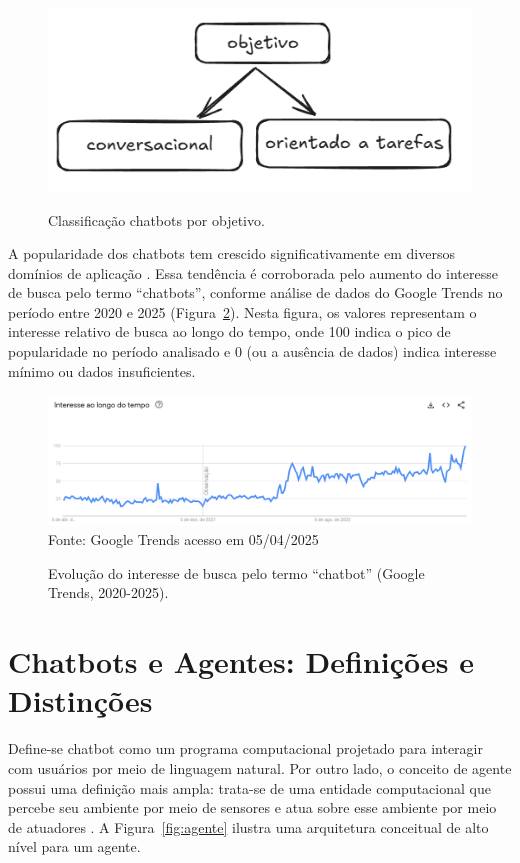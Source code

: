 \documentclass[14pt,a4paper,oneside]{book}
\begin{document}
\begin{figure}[!htbp]
	\centering
	\caption{Classificação chatbots por objetivo.}
	\includegraphics[width=0.9\linewidth]{./fig/tipo_objetivo.png}
	\label{fig:tipo}
\end{figure}

A popularidade dos chatbots tem crescido significativamente em diversos domínios de aplicação \cite{B2020, Klopfenstein2017, Sharma2020}. 
Essa tendência é corroborada pelo aumento do interesse de busca pelo termo ``chatbots'', conforme análise de dados do Google Trends no período entre 2020 e 2025 (Figura~\ref{fig:trends}). 
Nesta figura, os valores representam o interesse relativo de busca ao longo do tempo, onde 100 indica o pico de popularidade no período analisado e 0 (ou a ausência de dados) indica interesse mínimo ou dados insuficientes.

\begin{figure}[!htbp]
	\centering
	\caption{Evolução do interesse de busca pelo termo ``chatbot'' (Google Trends, 2020-2025).}
	\includegraphics[width=1\linewidth]{./fig/trends.png}
	\label{fig:trends}
	{\footnotesize Fonte: Google Trends acesso em 05/04/2025} %
\end{figure}

\section{Chatbots e Agentes: Definições e Distinções}

Define-se chatbot como um programa computacional projetado para interagir com usuários por meio de linguagem natural. Por outro lado, o conceito de agente possui uma definição mais ampla: trata-se de uma entidade computacional que percebe seu ambiente por meio de sensores e atua sobre esse ambiente por meio de atuadores \cite{Russel2013}. A Figura~\ref{fig:agente} ilustra uma arquitetura conceitual de alto nível para um agente.
\end{document}
